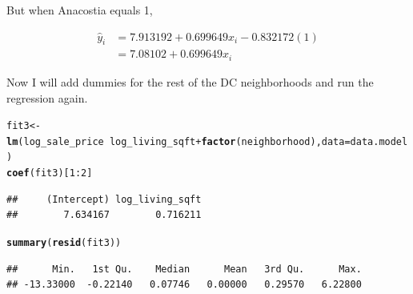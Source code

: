 \documentclass[10pt]{article}\usepackage[]{graphicx}\usepackage[]{color}
\makeatletter
\newcommand{\hlnum}[1]{\textcolor[rgb]{0.686,0.059,0.569}{#1}}%
\newcommand{\hlopt}[1]{\textcolor[rgb]{0,0,0}{#1}}%
\newcommand{\hlstd}[1]{\textcolor[rgb]{0.345,0.345,0.345}{#1}}%
\newcommand{\hlkwb}[1]{\textcolor[rgb]{0.69,0.353,0.396}{#1}}%
\newcommand{\hlkwc}[1]{\textcolor[rgb]{0.333,0.667,0.333}{#1}}%
\newcommand{\hlkwd}[1]{\textcolor[rgb]{0.737,0.353,0.396}{\textbf{#1}}}%
\newenvironment{kframe}{%
 \def\at@end@of@kframe{}%
 \ifinner\ifhmode%
  \def\at@end@of@kframe{\end{minipage}}%
  \begin{minipage}{\columnwidth}%
 \fi\fi%
 \def\FrameCommand##1{\hskip\@totalleftmargin \hskip-\fboxsep
 \colorbox{shadecolor}{##1}\hskip-\fboxsep
     \hskip-\linewidth \hskip-\@totalleftmargin \hskip\columnwidth}%
 \MakeFramed {\advance\hsize-\width
   \@totalleftmargin\z@ \linewidth\hsize
   \@setminipage}}%
 {\par\unskip\endMakeFramed%
 \at@end@of@kframe}
\newenvironment{knitrout}{}{} %
\makeatother
\begin{document}
But when Anacostia equals 1,

\begin{align*}
\hat{y}_i &= 7.913192 + 0.699649 x_i - 0.832172(1) \\
  &= 7.08102 + 0.699649 x_i
\end{align*}

Now I will add dummies for the rest of the DC neighborhoods and run the regression again.

\begin{knitrout}\small
{}\color{fgcolor}\begin{kframe}
\begin{alltt}
\hlstd{fit3}\hlkwb{<-}\hlkwd{lm}\hlstd{(log_sale_price} \hlopt{~} \hlstd{log_living_sqft} \hlopt{+} \hlkwd{factor}\hlstd{(neighborhood),}\hlkwc{data}\hlstd{=data.model)}
\hlkwd{coef}\hlstd{(fit3)[}\hlnum{1}\hlopt{:}\hlnum{2}\hlstd{]}
\end{alltt}
\begin{verbatim}
##     (Intercept) log_living_sqft 
##        7.634167        0.716211
\end{verbatim}
\begin{alltt}
\hlkwd{summary}\hlstd{(}\hlkwd{resid}\hlstd{(fit3))}
\end{alltt}
\begin{verbatim}
##      Min.   1st Qu.    Median      Mean   3rd Qu.      Max. 
## -13.33000  -0.22140   0.07746   0.00000   0.29570   6.22800
\end{verbatim}
\end{kframe}
\end{knitrout}


\newpage



\end{document}
